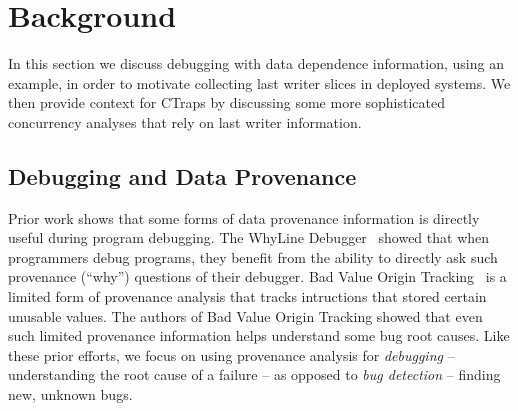 \documentclass[preprint,10pt]{sigplanconf}
\newcommand{\ctraps}{CTraps\xspace}
\begin{document}


\section{Background}

In this section we discuss debugging with data dependence information, using an
example, in order to motivate collecting last writer slices in deployed
systems.  We then provide context for \ctraps by discussing some more
sophisticated concurrency analyses that rely on last writer information.


\subsection{Debugging and Data Provenance}

Prior work shows that some forms of data provenance information is directly
useful during program debugging.  The WhyLine
Debugger~\cite{whylinechi,whylineicse} showed that when programmers debug
programs, they benefit from the ability to directly ask such provenance
(``why'') questions of their debugger.  Bad Value Origin
Tracking~\cite{badapples} is a limited form of provenance analysis that tracks
intructions that stored certain unusable values.  The authors of Bad Value Origin Tracking showed that even such limited provenance information
helps understand some bug root causes. Like these
prior efforts, we focus on using provenance analysis for
{\em debugging} -- understanding the root cause of a failure -- as opposed to
{\em bug detection} -- finding new, unknown bugs.
\end{document}
